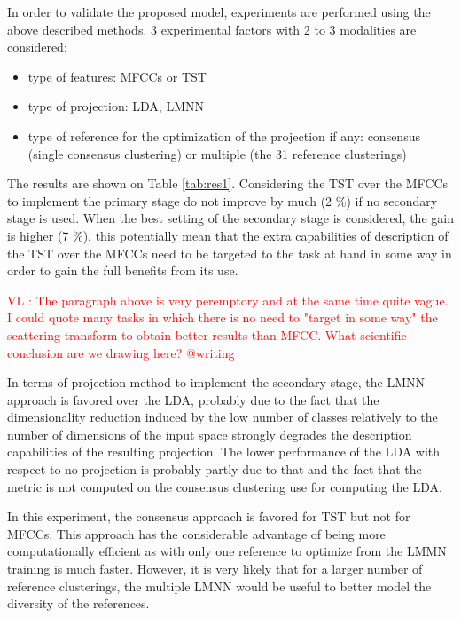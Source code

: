 \documentclass{article}
\newcommand{\vl}[1]{\textcolor{red}{VL : #1}}
\begin{document}
In order to validate the proposed model, experiments are performed using the above described methods. 3 experimental factors with 2 to 3 modalities are considered:
\begin{itemize}
  \item type of features: MFCCs or TST
  \item type of projection: LDA, LMNN
  \item type of reference for the optimization of the projection if any: consensus (single consensus clustering) or multiple (the 31 reference clusterings)
\end{itemize}
The results are shown on Table \ref{tab:res1}. Considering the TST over the MFCCs to implement the primary stage do not improve by much (2 \%) if no secondary stage is used. When the best setting of the secondary stage is considered, the gain is higher (7 \%). this potentially mean that the extra capabilities of description of the TST over the MFCCs need to be targeted to the task at hand in some way in order to gain the full benefits from its use.

\vl{The paragraph above is very peremptory and at the same time quite vague.
I could quote many tasks in which there is no need to "target in some way" the scattering transform to obtain better results than MFCC.
What scientific conclusion are we drawing here? @writing}

In terms of projection method to implement the secondary stage, the LMNN approach is favored over the LDA, probably due to the fact that the dimensionality reduction induced by the low number of classes relatively to the number of dimensions of the input space strongly degrades the description capabilities of the resulting projection. The lower performance of the LDA with respect to no projection is probably partly due to that and the fact that the metric is not computed on the consensus clustering use for computing the LDA.

In this experiment, the consensus approach is favored for TST but not for MFCCs. This approach has the considerable advantage of being more computationally efficient as with only one reference to optimize from the LMMN training is much faster. However, it is very likely that for a larger number of reference clusterings, the multiple LMNN would be useful to better model the diversity of the references.
\end{document}
